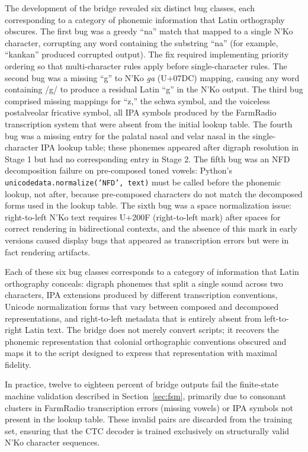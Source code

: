 \documentclass[11pt]{article}
\newcommand{\nko}{N'Ko}
\begin{document}
The development of the bridge revealed six distinct bug classes, each corresponding to a category of phonemic information that Latin orthography obscures. The first bug was a greedy ``na'' match that mapped to a single \nko{} character, corrupting any word containing the substring ``na'' (for example, ``kankan'' produced corrupted output). The fix required implementing priority ordering so that multi-character rules apply before single-character rules. The second bug was a missing ``g'' to \nko{} \emph{ga} (U+07DC) mapping, causing any word containing /g/ to produce a residual Latin ``g'' in the \nko{} output. The third bug comprised missing mappings for ``z,'' the schwa symbol, and the voiceless postalveolar fricative symbol, all IPA symbols produced by the FarmRadio transcription system that were absent from the initial lookup table. The fourth bug was a missing entry for the palatal nasal and velar nasal in the single-character IPA lookup table; these phonemes appeared after digraph resolution in Stage 1 but had no corresponding entry in Stage 2. The fifth bug was an NFD decomposition failure on pre-composed toned vowels: Python's \texttt{unicodedata.normalize('NFD', text)} must be called before the phonemic lookup, not after, because pre-composed characters do not match the decomposed forms used in the lookup table. The sixth bug was a space normalization issue: right-to-left \nko{} text requires U+200F (right-to-left mark) after spaces for correct rendering in bidirectional contexts, and the absence of this mark in early versions caused display bugs that appeared as transcription errors but were in fact rendering artifacts.

Each of these six bug classes corresponds to a category of information that Latin orthography conceals: digraph phonemes that split a single sound across two characters, IPA extensions produced by different transcription conventions, Unicode normalization forms that vary between composed and decomposed representations, and right-to-left metadata that is entirely absent from left-to-right Latin text. The bridge does not merely convert scripts; it recovers the phonemic representation that colonial orthographic conventions obscured and maps it to the script designed to express that representation with maximal fidelity.

In practice, twelve to eighteen percent of bridge outputs fail the finite-state machine validation described in Section~\ref{sec:fsm}, primarily due to consonant clusters in FarmRadio transcription errors (missing vowels) or IPA symbols not present in the lookup table. These invalid pairs are discarded from the training set, ensuring that the CTC decoder is trained exclusively on structurally valid \nko{} character sequences.
\end{document}
